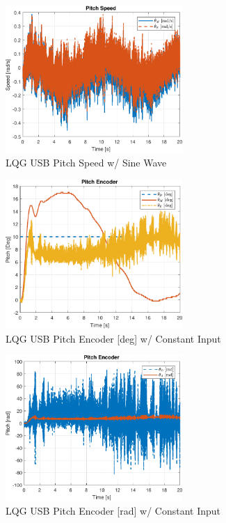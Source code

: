 \documentclass[fontsize=11pt, %
                             paper=letter, %
                             openany, %
                             captions=tableheading,
                             index=totoc,
                             hyperref]{labbook}
\begin{document}
\begin{addmargin}[0cm]{0cm}
\begin{figure}[h]
  \centering
  \includegraphics[width=0.6\textwidth]{figs/matlab/LQG/LQG_USB/Pitch_Speed_LQG_USB_SIN}
  \caption{LQG USB Pitch Speed w/ Sine Wave}
  \label{fig:Pitch_Speed_LQG_USB_SIN}
\end{figure}

\begin{figure}[h]
  \centering
  \includegraphics[width=0.6\textwidth]{figs/matlab/LQG/LQG_USB/Pitch_Pos_deg_LQG_USB_CON}
  \caption{LQG USB Pitch Encoder [deg] w/ Constant Input}
  \label{fig:Pitch_Pos_deg_LQG_USB_CON}
\end{figure}

\begin{figure}[h]
  \centering
  \includegraphics[width=0.6\textwidth]{figs/matlab/LQG/LQG_USB/Pitch_Pos_Rad_LQG_USB_CON}
  \caption{LQG USB Pitch Encoder [rad] w/ Constant Input}
  \label{fig:Pitch_Pos_Rad_LQG_USB_CON}
\end{figure}


\end{addmargin}
\end{document}
